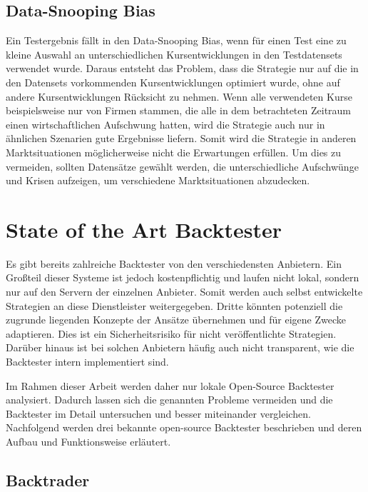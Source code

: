 \subsection{Data-Snooping Bias}
\label{subsec:DataSnoopingBias}

Ein Testergebnis fällt in den Data-Snooping Bias, wenn für einen Test eine zu kleine Auswahl an unterschiedlichen Kursentwicklungen in den Testdatensets verwendet wurde. 
Daraus entsteht das Problem, dass die Strategie nur auf die in den Datensets vorkommenden Kursentwicklungen optimiert wurde, ohne auf andere Kursentwicklungen Rücksicht zu nehmen.
Wenn alle verwendeten Kurse beispielsweise nur von Firmen stammen, die alle in dem betrachteten Zeitraum einen wirtschaftlichen Aufschwung hatten, wird die Strategie auch nur in ähnlichen Szenarien gute Ergebnisse liefern.
Somit wird die Strategie in anderen Marktsituationen möglicherweise nicht die Erwartungen erfüllen.
Um dies zu vermeiden, sollten Datensätze gewählt werden, die unterschiedliche Aufschwünge und Krisen aufzeigen, um verschiedene Marktsituationen abzudecken.
\cite{https://doi.org/10.1111/0022-1082.00163} \cite{LoMacKinlay1989}

\section{State of the Art Backtester}
\label{sec:StateoftheArtBacktester}

Es gibt bereits zahlreiche Backtester von den verschiedensten Anbietern. Ein Großteil dieser Systeme ist jedoch kostenpflichtig und laufen nicht lokal, sondern nur auf den Servern der einzelnen Anbieter.
\cite{FXReplay2025} \cite{BacktesterIO2025} \cite{BacktestingMax2025}
Somit werden auch selbst entwickelte Strategien an diese Dienstleister weitergegeben. Dritte könnten potenziell die zugrunde liegenden Konzepte der Ansätze übernehmen und für eigene Zwecke adaptieren.
Dies ist ein Sicherheitsrisiko für nicht veröffentlichte Strategien.
Darüber hinaus ist bei solchen Anbietern häufig auch nicht transparent, wie die Backtester intern implementiert sind.

Im Rahmen dieser Arbeit werden daher nur lokale Open-Source Backtester analysiert. Dadurch lassen sich die genannten Probleme vermeiden und die Backtester im Detail untersuchen und besser miteinander vergleichen.
Nachfolgend werden drei bekannte open-source Backtester beschrieben und deren Aufbau und Funktionsweise erläutert.

\subsection{Backtrader}
\label{subsec:Backtrader}

